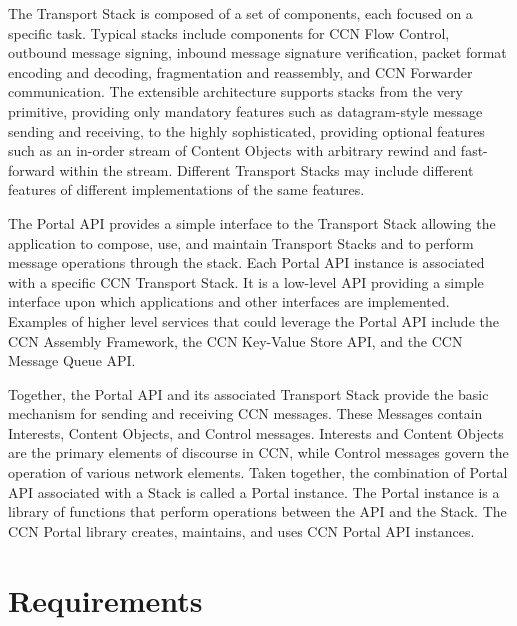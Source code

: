 The Transport Stack is composed of a set of components, each focused on a specific task. Typical stacks include components
for CCN Flow Control, outbound message signing, inbound message signature verification,
packet format encoding and decoding, fragmentation and reassembly, and CCN Forwarder communication.
The extensible architecture supports stacks from the very primitive, providing only  mandatory features such as datagram-style message sending and receiving, to the highly sophisticated, providing optional features such as an in-order stream of Content Objects with arbitrary rewind and fast-forward within the stream.  Different Transport Stacks may include different features of different implementations of the same
features.

The Portal API provides a simple interface to the Transport Stack allowing the application to compose, use, and maintain Transport Stacks and to perform message operations through the stack. Each Portal API instance is associated with a specific CCN Transport Stack.
It is a low-level API providing a simple interface upon which applications and other interfaces are implemented. Examples of higher level services that could leverage the Portal API include the CCN Assembly Framework, the CCN Key-Value Store API, and the CCN Message Queue API.

Together, the Portal API and its associated Transport Stack provide the basic mechanism for sending and receiving CCN messages. These Messages contain Interests, Content Objects, and Control messages.
Interests and Content Objects are the primary elements of discourse in CCN,
while Control messages govern the operation of various network elements. 
Taken together, the combination of Portal API associated with a Stack is called a Portal instance. 
The Portal instance is a library of functions that perform operations between the API and the Stack.
The CCN Portal library creates, maintains, and uses CCN Portal API instances.

\section{Requirements}

